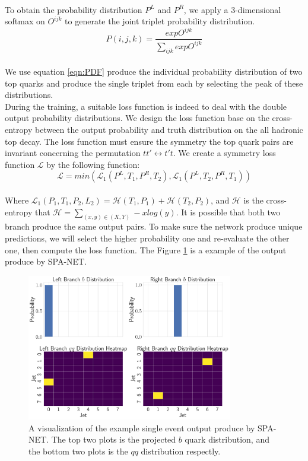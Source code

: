 \\
To obtain the probability distribution $P^{L}$ and $P^{R}$, we apply a 3-dimensional softmax on $O^{ijk}$ to generate the joint triplet probability distribution.
\\
\begin{equation}[h]\label{eqn:PDF}
	P(i,j,k) = \frac{exp O^{ijk}}{\sum_{ijk} exp O^{ijk}}
\end{equation}
\\
We use equation \ref{eqn:PDF} produce the individual probability distribution of two top quarks and produce the single triplet from each by selecting the peak of these distributions. 
\\
During the training, a suitable loss function is indeed to deal with the double output probability distributions. We design the loss function base on the cross-entropy between the output probability and truth distribution on the all hadronic top decay. The loss function must ensure the symmetry the top quark pairs are invariant concerning the permutation $tt' \leftrightarrow t't$.  We create a symmetry loss function $\mathcal{L}$ by the following function:
\\
\begin{equation}
	\mathcal{L} = min(\mathcal{L}_{1}(P^{L}, T_{1}, P^{R}, T_{2}), \mathcal{L}_{1}(P^{L}, T_{2}, P^{R}, T_{1}))
\end{equation}
\\
Where $\mathcal{L}_{1}(P_{1}, T_{1}, P_{2}, L_{2}) = \mathcal{H}(T_{1}, P_{1}) +\mathcal{H}(T_{2}, P_{2})$, and $\mathcal{H}$ is the cross-entropy that $\mathcal{H} = \sum_{(x,y)\in (X,Y)} -xlog(y)$. It is possible that both two branch produce the same output pairs. To make sure the network produce unique predictions, we will select the higher probability one and re-evaluate the other one, then compute the loss function. The Figure \ref{fig:output} is a example of the output produce by SPA-NET.


\begin{figure}[H]
	\centering
	\includegraphics[width=0.8\textwidth]{Figures/typical_output.pdf}
	\caption{A visualization of the example single event output produce by SPA-NET. The top two plots is the projected $b$ quark distribution, and the bottom two plots is the $qq$ distribution respectly. }
	\label{fig:output}
\end{figure}








